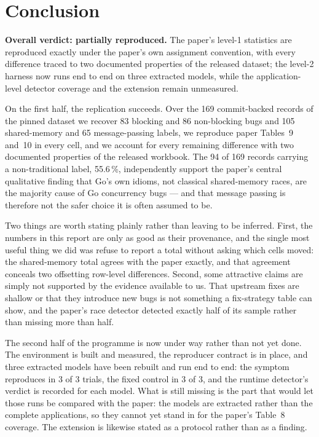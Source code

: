 \documentclass[11pt]{article}
\begin{document}
\section{Conclusion}

\textbf{Overall verdict: partially reproduced.} The paper's level-1
statistics are reproduced exactly under the paper's own assignment
convention, with every difference traced to two documented properties of the
released dataset; the level-2 harness now runs end to end on three extracted
models, while the application-level detector coverage and the extension
remain unmeasured.

On the first half, the replication succeeds. Over the 169 commit-backed
records of the pinned dataset we recover 83 blocking and 86 non-blocking bugs
and 105 shared-memory and 65 message-passing labels, we reproduce paper
Tables~9 and~10 in every cell, and we account for every remaining difference
with two documented properties of the released workbook. The 94 of 169
records carrying a non-traditional label, 55.6\,\%, independently support the
paper's central qualitative finding that Go's own idioms, not classical
shared-memory races, are the majority cause of Go concurrency bugs --- and
that message passing is therefore not the safer choice it is often assumed
to be.

Two things are worth stating plainly rather than leaving to be inferred.
First, the numbers in this report are only as good as their provenance, and
the single most useful thing we did was refuse to report a total without
asking which cells moved: the shared-memory total agrees with the paper
exactly, and that agreement conceals two offsetting row-level differences.
Second, some attractive claims are simply not supported by the evidence
available to us. That upstream fixes are shallow or that they introduce new
bugs is not something a fix-strategy table can show, and the paper's race
detector detected exactly half of its sample rather than missing more than
half.

The second half of the programme is now under way rather than not yet done.
The environment is built and measured, the reproducer contract is in place, and
three extracted models have been rebuilt and run end to end: the symptom
reproduces in 3 of 3 trials, the fixed control in 3 of 3, and the runtime
detector's verdict is recorded for each model. What is still missing is the
part that would let those runs be compared with the paper: the models are
extracted rather than the complete applications, so they cannot yet stand in
for the paper's Table~8 coverage. The extension is likewise stated as a
protocol rather than as a finding.
\end{document}
